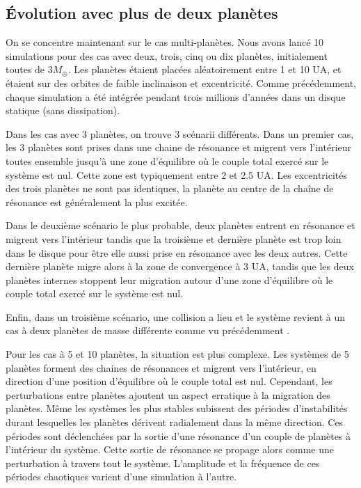 \subsection{Évolution avec plus de deux planètes}
On se concentre maintenant sur le cas multi-planètes. Nous avons lancé 10 simulations pour des cas avec deux, trois, cinq ou dix planètes, initialement toutes de $3\unit{M_\oplus}$. Les planètes étaient placées aléatoirement entre 1 et 10 UA, et étaient sur des orbites de faible inclinaison et excentricité. Comme précédemment, chaque simulation a été intégrée pendant trois millions d'années dans un disque statique (sans dissipation). 

\bigskip

Dans les cas avec 3 planètes, on trouve 3 scénarii différents. Dans un premier cas, les 3 planètes sont prises dans une chaine de résonance et migrent vers l'intérieur toutes ensemble jusqu'à une zone d'équilibre où le couple total exercé sur le système est nul. Cette zone est typiquement entre 2 et 2.5 UA. Les excentricités des trois planètes ne sont pas identiques, la planète au centre de la chaîne de résonance est généralement la plus excitée. 

Dans le deuxième scénario le plus probable, deux planètes entrent en résonance et migrent vers l'intérieur tandis que la troisième et dernière planète est trop loin dans le disque pour être elle aussi prise en résonance avec les deux autres. Cette dernière planète migre alors à la zone de convergence à 3 UA, tandis que les deux planètes internes stoppent leur migration autour d'une zone d'équilibre où le couple total exercé sur le système est nul. 

Enfin, dans un troisième scénario, une collision a lieu et le système revient à un cas à deux planètes de masse différente comme vu précédemment . 

\bigskip

Pour les cas à 5 et 10 planètes, la situation est plus complexe. Les systèmes de 5 planètes forment des chaines de résonances et migrent vers l'intérieur, en direction d'une position d'équilibre où le couple total est nul. Cependant, les perturbations entre planètes ajoutent un aspect erratique à la migration des planètes. Même les systèmes les plus stables subissent des périodes d'instabilités durant lesquelles les planètes dérivent radialement dans la même direction. Ces périodes sont déclenchées par la sortie d'une résonance d'un couple de planètes à l'intérieur du système. Cette sortie de résonance se propage alors comme une perturbation à travers tout le système. L'amplitude et la fréquence de ces périodes chaotiques varient d'une simulation à l'autre. 

